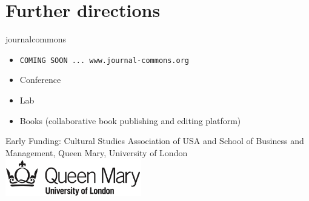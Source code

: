 \section{Further directions}
\begin{frame}{journalcommons}{}
 
\begin{itemize}
 \item {\tt COMING SOON ... www.journal-commons.org}
 \item Conference
 \item Lab
 \item Books (collaborative book publishing and editing platform)
\end{itemize}

\vfill

Early Funding: Cultural Studies Association of USA and School of
Business and Management, Queen Mary, University of London
\includegraphics[scale=0.5]{qm-logo.png}

\end{frame}
